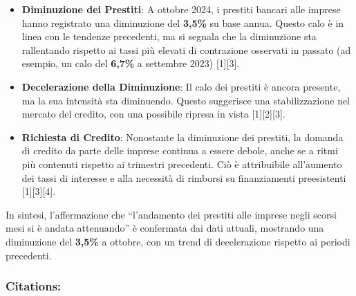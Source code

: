 \documentclass[
  letterpaper,
  DIV=11,
  numbers=noendperiod]{scrartcl}
\begin{document}
\begin{itemize}
\item
  \textbf{Diminuzione dei Prestiti}: A ottobre 2024, i prestiti bancari
  alle imprese hanno registrato una diminuzione del \textbf{3,5\%} su
  base annua. Questo calo è in linea con le tendenze precedenti, ma si
  segnala che la diminuzione sta rallentando rispetto ai tassi più
  elevati di contrazione osservati in passato (ad esempio, un calo del
  \textbf{6,7\%} a settembre 2023) {[}1{]}{[}3{]}.
\item
  \textbf{Decelerazione della Diminuzione}: Il calo dei prestiti è
  ancora presente, ma la sua intensità sta diminuendo. Questo suggerisce
  una stabilizzazione nel mercato del credito, con una possibile ripresa
  in vista {[}1{]}{[}2{]}{[}3{]}.
\item
  \textbf{Richiesta di Credito}: Nonostante la diminuzione dei prestiti,
  la domanda di credito da parte delle imprese continua a essere debole,
  anche se a ritmi più contenuti rispetto ai trimestri precedenti. Ciò è
  attribuibile all'aumento dei tassi di interesse e alla necessità di
  rimborsi su finanziamenti preesistenti {[}1{]}{[}3{]}{[}4{]}.
\end{itemize}

\begin{tcolorbox}[enhanced jigsaw, coltitle=black, colbacktitle=quarto-callout-warning-color!10!white, bottomtitle=1mm, colback=white, bottomrule=.15mm, breakable, arc=.35mm, opacitybacktitle=0.6, toprule=.15mm, left=2mm, colframe=quarto-callout-warning-color-frame, title=\textcolor{quarto-callout-warning-color}{\faExclamationTriangle}\hspace{0.5em}{Conclusione}, titlerule=0mm, toptitle=1mm, rightrule=.15mm, leftrule=.75mm, opacityback=0]

In sintesi, l'affermazione che ``l'andamento dei prestiti alle imprese
negli scorsi mesi si è andata attenuando'' è confermata dai dati
attuali, mostrando una diminuzione del \textbf{3,5\%} a ottobre, con un
trend di decelerazione rispetto ai periodi precedenti.

\end{tcolorbox}

\subsubsection{Citations:}\label{citations-2}
\end{document}
